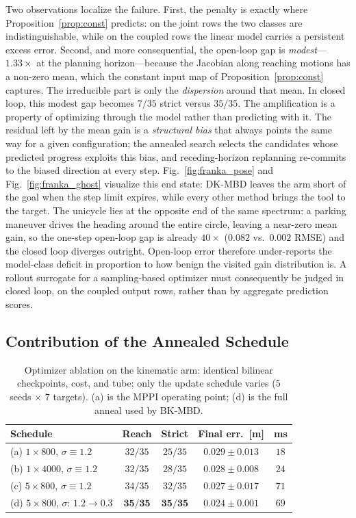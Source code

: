 \documentclass[lettersize,journal]{IEEEtran}
\theoremstyle{remark}
\newcommand{\dkmbd}{\textsc{DK-MBD}}
\newcommand{\bkmbd}{\textsc{BK-MBD}}
\begin{document}
Two observations localize the failure. First, the penalty is exactly where
Proposition~\ref{prop:const} predicts: on the joint rows the two classes
are indistinguishable, while on the coupled rows the linear model carries
a persistent excess error. Second, and more consequential, the open-loop
gap is \emph{modest}---$1.33\times$ at the planning horizon---because
the Jacobian along reaching motions has a non-zero mean, which the
constant input map of Proposition~\ref{prop:const} captures. The
irreducible part is only the \emph{dispersion} around that mean. In
closed loop, this modest gap becomes $7/35$ strict versus $35/35$. The
amplification is a property of optimizing through the model rather than
predicting with it. The residual left by the mean gain is a
\emph{structural bias} that always points the same way for a given
configuration; the annealed search selects the candidates whose
predicted progress exploits this bias, and receding-horizon replanning
re-commits to the biased direction at every step.
Fig.~\ref{fig:franka_pose} and Fig.~\ref{fig:franka_ghost} visualize
this end state: \dkmbd{} leaves the arm short of the goal when the
step limit expires, while every other method brings the tool to the
target. The unicycle
lies at the opposite end of the same spectrum: a parking maneuver drives the
heading around the entire circle, leaving a near-zero mean gain, so the
one-step open-loop gap is already $40\times$ ($0.082$ vs.\ $0.002$
RMSE) and the closed loop diverges outright. Open-loop error
therefore under-reports the model-class deficit in proportion to how
benign the visited gain distribution is. A rollout surrogate for a
sampling-based optimizer must consequently be judged in closed loop, on
the coupled output rows, rather than by aggregate prediction scores.

\subsection{Contribution of the Annealed Schedule}\label{subsec:exp_anneal}

\begin{table}[!t]
\centering
\caption{Optimizer ablation on the kinematic arm: identical bilinear
checkpoints, cost, and tube; only the update schedule varies ($5$ seeds
$\times$ $7$ targets). (a) is the MPPI operating point; (d) is the full
anneal used by \bkmbd{}.}
\label{tab:anneal}
\begin{tabular}{lcccc}
\hline
Schedule & Reach & Strict & Final err.\ [m] & ms \\
\hline
(a) $1{\times}800$, $\sigma{\equiv}1.2$ & $32/35$ & $25/35$ & $0.029 \pm 0.013$ & $18$ \\
(b) $1{\times}4000$, $\sigma{\equiv}1.2$ & $32/35$ & $28/35$ & $0.028 \pm 0.008$ & $24$ \\
(c) $5{\times}800$, $\sigma{\equiv}1.2$ & $34/35$ & $32/35$ & $0.027 \pm 0.017$ & $71$ \\
(d) $5{\times}800$, $\sigma{:}\,1.2{\to}0.3$ & $\mathbf{35/35}$ & $\mathbf{35/35}$ & $\mathbf{0.024 {\pm} 0.001}$ & $69$ \\
\hline
\end{tabular}
\end{table}
\end{document}
